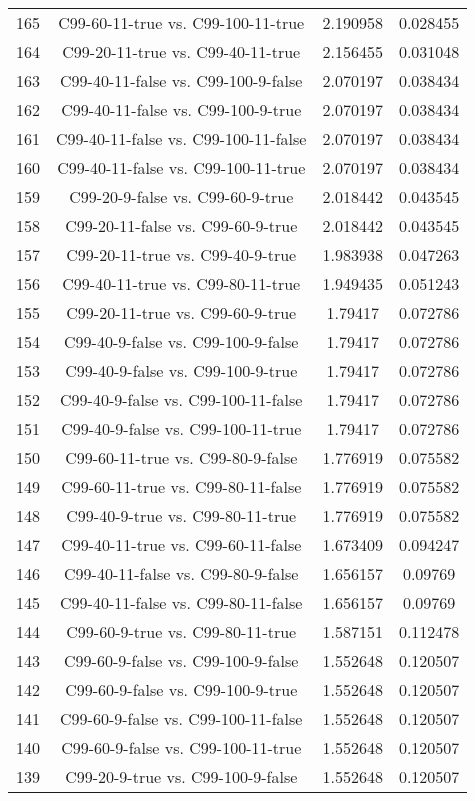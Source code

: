 \documentclass[a4paper,10pt]{article}
\begin{document}
\begin{landscape}
\begin{table}[!htp]
\begin{tabular}{cccc}
165&C99-60-11-true vs. C99-100-11-true&2.190958&0.028455\\
164&C99-20-11-true vs. C99-40-11-true&2.156455&0.031048\\
163&C99-40-11-false vs. C99-100-9-false&2.070197&0.038434\\
162&C99-40-11-false vs. C99-100-9-true&2.070197&0.038434\\
161&C99-40-11-false vs. C99-100-11-false&2.070197&0.038434\\
160&C99-40-11-false vs. C99-100-11-true&2.070197&0.038434\\
159&C99-20-9-false vs. C99-60-9-true&2.018442&0.043545\\
158&C99-20-11-false vs. C99-60-9-true&2.018442&0.043545\\
157&C99-20-11-true vs. C99-40-9-true&1.983938&0.047263\\
156&C99-40-11-true vs. C99-80-11-true&1.949435&0.051243\\
155&C99-20-11-true vs. C99-60-9-true&1.79417&0.072786\\
154&C99-40-9-false vs. C99-100-9-false&1.79417&0.072786\\
153&C99-40-9-false vs. C99-100-9-true&1.79417&0.072786\\
152&C99-40-9-false vs. C99-100-11-false&1.79417&0.072786\\
151&C99-40-9-false vs. C99-100-11-true&1.79417&0.072786\\
150&C99-60-11-true vs. C99-80-9-false&1.776919&0.075582\\
149&C99-60-11-true vs. C99-80-11-false&1.776919&0.075582\\
148&C99-40-9-true vs. C99-80-11-true&1.776919&0.075582\\
147&C99-40-11-true vs. C99-60-11-false&1.673409&0.094247\\
146&C99-40-11-false vs. C99-80-9-false&1.656157&0.09769\\
145&C99-40-11-false vs. C99-80-11-false&1.656157&0.09769\\
144&C99-60-9-true vs. C99-80-11-true&1.587151&0.112478\\
143&C99-60-9-false vs. C99-100-9-false&1.552648&0.120507\\
142&C99-60-9-false vs. C99-100-9-true&1.552648&0.120507\\
141&C99-60-9-false vs. C99-100-11-false&1.552648&0.120507\\
140&C99-60-9-false vs. C99-100-11-true&1.552648&0.120507\\
139&C99-20-9-true vs. C99-100-9-false&1.552648&0.120507\\

\end{tabular}
\end{table}
\end{landscape}
\end{document}
